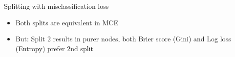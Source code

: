 \documentclass[11pt,compress,t,notes=noshow, xcolor=table]{beamer}
\begin{document}
\begin{vbframe}{Splitting with misclassification loss}
\lz

\begin{itemize}
\item Both splits are equivalent in MCE
\item But: Split 2 results in purer nodes, both Brier score (Gini) and Log loss (Entropy) prefer 2nd split
\end{itemize}








\end{vbframe}




\endlecture
\end{document}
